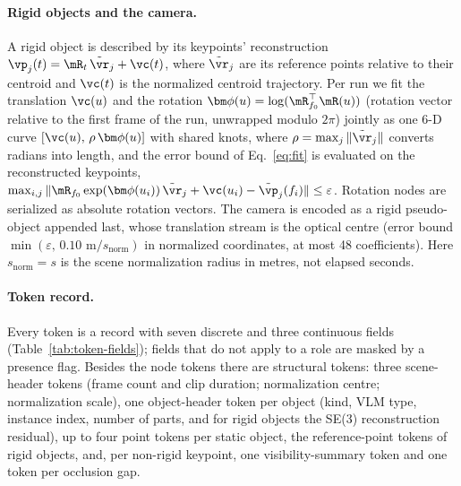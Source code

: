 \paragraph{Rigid objects and the camera.}
A rigid object is described by its keypoints' reconstruction $\vp_j(t)=\mR_t\,\tilde{\vr}_j+\vc(t)$, where $\tilde{\vr}_j$ are its reference points relative to their centroid and $\vc(t)$ is the normalized centroid trajectory.
Per run we fit the translation $\vc(u)$ and the rotation $\vphi(u)=\log(\mR_{f_0}^{\top}\mR(u))$ (rotation vector relative to the first frame of the run, unwrapped modulo $2\pi$) jointly as one 6-D curve $[\vc(u),\,\rho\,\vphi(u)]$ with shared knots, where $\rho=\max_j\|\tilde{\vr}_j\|$ converts radians into length, and the error bound of Eq.~\ref{eq:fit} is evaluated on the reconstructed keypoints, $\max_{i,j}\|\mR_{f_0}\exp(\vphi(u_i))\,\tilde{\vr}_j+\vc(u_i)-\tilde{\vp}_j(f_i)\|\le\varepsilon$.
Rotation nodes are serialized as absolute rotation vectors.
The camera is encoded as a rigid pseudo-object appended last, whose translation stream is the optical centre (error bound $\min(\varepsilon,\,0.10\text{ m}/s_{\mathrm{norm}})$ in normalized coordinates, at most 48 coefficients). Here $s_{\mathrm{norm}}=s$ is the scene normalization radius in metres, not elapsed seconds.

\paragraph{Token record.}
Every token is a record with seven discrete and three continuous fields (Table~\ref{tab:token-fields}); fields that do not apply to a role are masked by a presence flag.
Besides the node tokens there are structural tokens: three scene-header tokens (frame count and clip duration; normalization centre; normalization scale), one object-header token per object (kind, VLM type, instance index, number of parts, and for rigid objects the SE(3) reconstruction residual), up to four point tokens per static object, the reference-point tokens of rigid objects, and, per non-rigid keypoint, one visibility-summary token and one token per occlusion gap.

